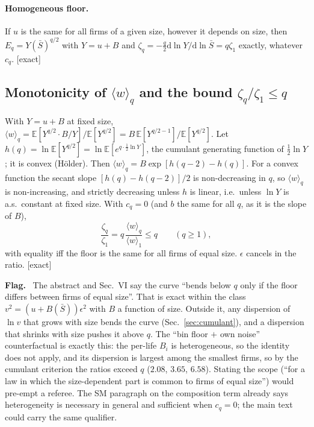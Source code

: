 \documentclass[11pt]{article}
\newcommand{\E}{\mathbb E}
\newcommand{\Sb}{\bar S}
\newcommand{\dd}{\mathrm d}
\newcommand{\exact}{\textsf{\small[exact]}}
\newenvironment{flag}{\par\medskip\noindent\textcolor{red!70!black}{\textbf{Flag.}}\ }{\par\medskip}
\begin{document}
\paragraph{Homogeneous floor.}  If $u$ is the same for all firms of a given size, however it depends on size, then
$E_q=Y(\Sb)^{q/2}$ with $Y=u+B$ and $\zeta_q=-\tfrac q2\dd\ln Y/\dd\ln\Sb=q\zeta_1$ exactly, whatever $c_q$.  \exact

\subsection{Monotonicity of $\langle w\rangle_q$ and the bound $\zeta_q/\zeta_1\le q$}

With $Y=u+B$ at fixed size, $\langle w\rangle_q=\E[Y^{q/2}\cdot B/Y]/\E[Y^{q/2}]=B\,\E[Y^{q/2-1}]/\E[Y^{q/2}]$.  Let
$h(q)=\ln\E[Y^{q/2}]=\ln\E[e^{q\cdot\frac12\ln Y}]$, the cumulant generating function of $\tfrac12\ln Y$; it is convex (H\"older).  Then
$\langle w\rangle_q=B\exp[h(q-2)-h(q)]$.  For a convex function the secant slope $[h(q)-h(q-2)]/2$ is non-decreasing in $q$, so
$\langle w\rangle_q$ is non-increasing, and strictly decreasing unless $h$ is linear, i.e.\ unless $\ln Y$ is a.s.\ constant at fixed size.
With $c_q=0$ (and $b$ the same for all $q$, as it is the slope of $B$),
\begin{equation}
\frac{\zeta_q}{\zeta_1}=q\,\frac{\langle w\rangle_q}{\langle w\rangle_1}\le q\qquad(q\ge1),
\end{equation}
with equality iff the floor is the same for all firms of equal size.  $\epsilon$ cancels in the ratio.  \exact

\begin{flag}
The abstract and Sec.~VI say the curve ``bends below $q$ only if the floor differs between firms of equal size''.  That is
exact within the class $v^2=(u+B(\Sb))\epsilon^2$ with $B$ a function of size.  Outside it, any dispersion of $\ln v$ that grows
with size bends the curve (Sec.~\ref{sec:cumulant}), and a dispersion that shrinks with size pushes it above $q$.  The
``bin floor $+$ own noise'' counterfactual is exactly this: the per-life $B_i$ is heterogeneous, so the identity does not apply,
and its dispersion is largest among the smallest firms, so by the cumulant criterion the ratios exceed $q$ ($2.08$, $3.65$,
$6.58$).  Stating the scope (``for a law in which the size-dependent part is common to firms of equal size'') would
pre-empt a referee.  The SM paragraph on the composition term already says heterogeneity is necessary in general and
sufficient when $c_q=0$; the main text could carry the same qualifier.
\end{flag}
\end{document}
